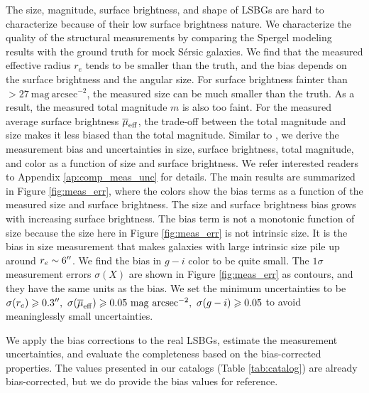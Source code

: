 \documentclass[twocolumn,astrosymb,twocolappendix]{aastex631}
\newcommand{\sbunit}{\mathrm{mag\ arcsec}^{-2}}
\newcommand{\sersic}{S\'ersic}
\begin{document}
\begin{CJK*}{UTF8}{gbsn}
The size, magnitude, surface brightness, and shape of LSBGs are hard to characterize because of their low surface brightness nature. We characterize the quality of the structural measurements by comparing the Spergel modeling results with the ground truth for mock \sersic{} galaxies. We find that the measured effective radius $r_e$ tends to be smaller than the truth, and the bias depends on the surface brightness and the angular size. For surface brightness fainter than $>27\ \sbunit$, the measured size can be much smaller than the truth. As a result, the measured total magnitude $m$ is also too faint. For the measured average surface brightness $\overline{\mu}_{\rm eff}$, the trade-off between the total magnitude and size makes it less biased than the total magnitude. Similar to \citet{Zaritsky2021}, we derive the measurement bias and uncertainties in size, surface brightness, total magnitude, and color as a function of size and surface brightness. We refer interested readers to Appendix \ref{ap:comp_meas_unc} for details. The main results are summarized in Figure \ref{fig:meas_err}, where the colors show the bias terms as a function of the measured size and surface brightness. The size and surface brightness bias grows with increasing surface brightness. The bias term is not a monotonic function of size because the size here in Figure \ref{fig:meas_err} is not intrinsic size. It is the bias in size measurement that makes galaxies with large intrinsic size pile up around $r_e\sim 6\mbox{$^{\prime\prime}$}$. We find the bias in $g-i$ color to be quite small. The $1\sigma$ measurement errors $\sigma(X)$ are shown in Figure \ref{fig:meas_err} as contours, and they have the same units as the bias. We set the minimum uncertainties to be $\sigma(r_e) \geqslant 0.3\arcsec,\ \sigma(\overline{\mu}_{\rm eff}) \geqslant 0.05\ \sbunit,\ \sigma(g-i) \geqslant 0.05$ to avoid meaninglessly small uncertainties. 

We apply the bias corrections to the real LSBGs, estimate the measurement uncertainties, and evaluate the completeness based on the bias-corrected properties. 
The values presented in our catalogs (Table \ref{tab:catalog}) are already bias-corrected, but we do provide the bias values for reference. 



\end{CJK*}
\end{document}
